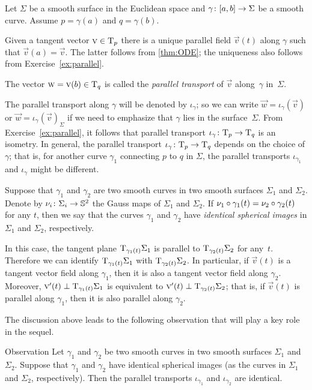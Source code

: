 Let $\Sigma$ be a smooth surface in the Euclidean space and $\gamma\:[a,b]\z\to \Sigma$ be a smooth curve.
Assume $p=\gamma(a)$ and $q=\gamma(b)$.

Given a tangent vector ${\text{\sc{v}}}\in\mathrm{T}_p$ there is a unique parallel field ${\vec v}(t)$ along $\gamma$ such that ${\vec v}(a)={\vec v}$.
The latter follows from \ref{thm:ODE}; the uniqueness also follows from Exercise~\ref{ex:parallel}.

The vector $\text{\sc{w}}={\text{\sc{v}}}(b)\in\mathrm{T}_q$ is called the \emph{parallel transport} of ${\vec v}$ along~$\gamma$ in~$\Sigma$.

The parallel transport along $\gamma$ will be denoted by $\iota_\gamma$;
so we can write $\vec w=\iota_\gamma({\vec v})$ or  $\vec w=\iota_\gamma({\vec v})_\Sigma$ if we need to emphasize that $\gamma$ lies in the surface~$\Sigma$.
From  Exercise~\ref{ex:parallel}, it follows that parallel transport $\iota_\gamma\:\T_p\z\to\T_q$ is an isometry.
In general, the parallel transport $\iota_\gamma\:\T_p\z\to\T_q$ depends on the choice of $\gamma$; that is, for another curve $\gamma_1$ connecting $p$ to $q$ in $\Sigma$, the parallel transports $\iota_{\gamma_1}$ and $\iota_{\gamma}$ might be different.

Suppose that $\gamma_1$ and $\gamma_2$ are two smooth curves in two smooth surfaces $\Sigma_1$ and $\Sigma_2$.
Denote by $\nu_i\colon\Sigma_i\to\mathbb{S}^2$ the Gauss maps of $\Sigma_1$ and $\Sigma_2$.
If $\nu_1\circ\gamma_1(t)= \nu_2\circ\gamma_2(t)$ for any $t$, then we say that the curves $\gamma_1$ and $\gamma_2$ have {}\emph{identical spherical images} in $\Sigma_1$ and $\Sigma_2$, respectively.

In this case, the tangent plane $\mathrm{T}_{\gamma_1(t)}\Sigma_1$ is parallel to $\mathrm{T}_{\gamma_2(t)}\Sigma_2$ for any~$t$.
Therefore we can identify $\mathrm{T}_{\gamma_1(t)}\Sigma_1$ with $\mathrm{T}_{\gamma_2(t)}\Sigma_2$.
In particular, if $\vec v(t)$ is a tangent vector field along $\gamma_1$,
then it is also a tangent vector field along $\gamma_2$.
Moreover, $\text{\sc{v}}'(t)\perp \mathrm{T}_{\gamma_1(t)}\Sigma_1$ is equivalent to $\text{\sc{v}}'(t)\perp \mathrm{T}_{\gamma_2(t)}\Sigma_2$; that is, if $\vec v(t)$ is parallel along $\gamma_1$,
then it is also parallel along $\gamma_2$.

The discussion above leads to the following observation that will play a key role in the sequel.

\begin{thm}{Observation}\label{obs:parallel=}
Let $\gamma_1$ and $\gamma_2$ be two smooth curves in two smooth surfaces $\Sigma_1$ and $\Sigma_2$.
Suppose that $\gamma_1$ and $\gamma_2$ have identical spherical images (as the curves in $\Sigma_1$ and $\Sigma_2$, respectively).
Then the parallel transports $\iota_{\gamma_1}$ and $\iota_{\gamma_2}$ are identical. 
\end{thm}

